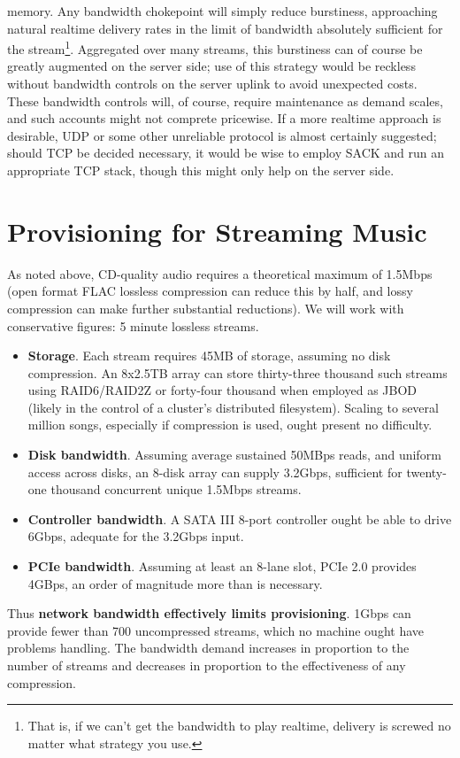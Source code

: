\documentclass[]{sigplanconf}
\begin{document}
\begin{itemize}
memory. Any bandwidth chokepoint will simply reduce burstiness, approaching
natural realtime delivery rates in the limit of bandwidth absolutely sufficient
for the stream\footnote{That is, if we can't get the bandwidth to play realtime,
delivery is screwed no matter what strategy you use.}. Aggregated over many
streams, this burstiness can of course be greatly augmented on the server side;
use of this strategy would be reckless without bandwidth controls on the server
uplink to avoid unexpected costs. These bandwidth controls will, of course,
require maintenance as demand scales, and such accounts might not comprete
pricewise. If a more realtime approach is desirable, UDP or some other unreliable
protocol is almost certainly suggested; should TCP be decided necessary,
it would be wise to employ SACK and run an appropriate TCP stack, though this
might only help on the server side\cite{tcp}.
\end{itemize}

\section{Provisioning for Streaming Music}
As noted above, CD-quality audio requires a theoretical maximum of 1.5Mbps
(open format FLAC lossless compression can reduce this by half, and lossy
compression can make further substantial reductions). We will work with
conservative figures: 5 minute lossless streams.
\begin{itemize}
\item \textbf{Storage}. Each stream requires 45MB of storage, assuming no
disk compression. An 8x2.5TB array can store thirty-three thousand
such streams using RAID6/RAID2Z or forty-four thousand when employed as JBOD 
(likely in the control of a cluster's distributed filesystem). Scaling to
several million songs, especially if compression is used, ought present no
difficulty.
\item \textbf{Disk bandwidth}. Assuming average sustained 50MBps reads, and
uniform access across disks, an 8-disk array can supply 3.2Gbps, sufficient
for twenty-one thousand concurrent unique 1.5Mbps streams.
\item \textbf{Controller bandwidth}. A SATA III 8-port controller ought be
able to drive 6Gbps, adequate for the 3.2Gbps input.
\item \textbf{PCIe bandwidth}. Assuming at least an 8-lane slot, PCIe 2.0
provides 4GBps, an order of magnitude more than is necessary.
\end{itemize}
Thus \textbf{network bandwidth effectively limits provisioning}. 1Gbps can
provide fewer than 700 uncompressed streams, which no machine ought have
problems handling. The bandwidth demand increases in proportion to the number
of streams and decreases in proportion to the effectiveness of any compression. 
\end{document}
